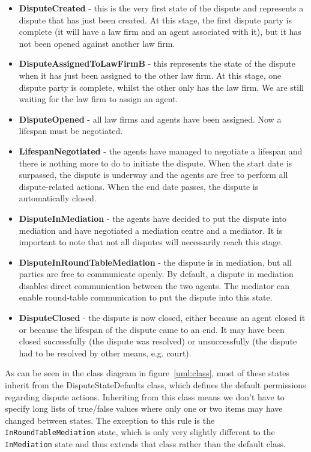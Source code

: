 \begin{itemize}
    \item \textbf{DisputeCreated} - this is the very first state of the dispute and represents a dispute that has just been created. At this stage, the first dispute party is complete (it will have a law firm and an agent associated with it), but it has not been opened against another law firm.
    \item \textbf{DisputeAssignedToLawFirmB} - this represents the state of the dispute when it has just been assigned to the other law firm. At this stage, one dispute party is complete, whilst the other only has the law firm. We are still waiting for the law firm to assign an agent.
    \item \textbf{DisputeOpened} - all law firms and agents have been assigned. Now a lifespan must be negotiated.
    \item \textbf{LifespanNegotiated} - the agents have managed to negotiate a lifespan and there is nothing more to do to initiate the dispute. When the start date is surpassed, the dispute is underway and the agents are free to perform all dispute-related actions. When the end date passes, the dispute is automatically closed.
    \item \textbf{DisputeInMediation} - the agents have decided to put the dispute into mediation and have negotiated a mediation centre and a mediator. It is important to note that not all disputes will necessarily reach this stage.
    \item \textbf{DisputeInRoundTableMediation} - the dispute is in mediation, but all parties are free to communicate openly. By default, a dispute in mediation disables direct communication between the two agents. The mediator can enable round-table communication to put the dispute into this state.
    \item \textbf{DisputeClosed} - the dispute is now closed, either because an agent closed it or because the lifespan of the dispute came to an end. It may have been closed successfully (the dispute was resolved) or unsuccessfully (the dispute had to be resolved by other means, e.g. court).
\end{itemize}

As can be seen in the class diagram in figure~\ref{uml:class}, most of these states inherit from the DisputeStateDefaults class, which defines the default permissions regarding dispute actions. Inheriting from this class means we don't have to specify long lists of true/false values where only one or two items may have changed between states. The exception to this rule is the \lstinline{InRoundTableMediation} state, which is only very slightly different to the \lstinline{InMediation} state and thus extends that class rather than the default class.

